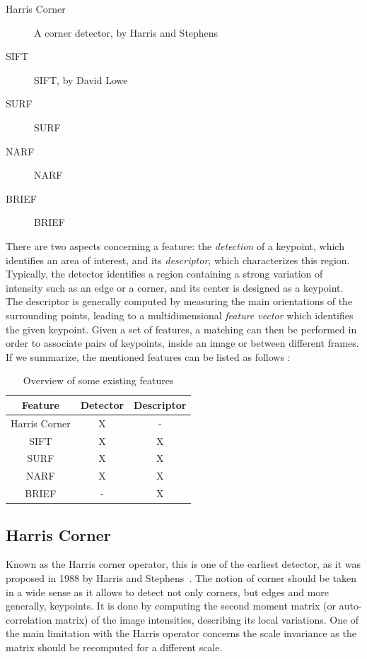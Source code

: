 \begin{description}
\item[Harris Corner] A corner detector, by Harris and Stephens~\cite{Harris88alvey}
\item[\acrshort{SIFT}]\acrlong{SIFT}, by David Lowe~\cite{lowe_2004_sift} 
\item[\acrshort{SURF}]\acrlong{SURF}~\cite{surf}
\item[\acrshort{NARF}]\acrlong{NARF}~\cite{steder10irosws}
\item[\acrshort{BRIEF}]\acrlong{BRIEF}~\cite{Calonder10-brief}
\end{description}

There are two aspects concerning a feature: the \emph{detection} of a keypoint, which identifies an area of interest, and its \emph{descriptor}, which characterizes this region. Typically, the detector identifies a region containing a strong variation of intensity such as an edge or a corner, and its center is designed as a keypoint. The descriptor is generally computed by measuring the main orientations of the surrounding points, leading to a multidimensional \emph{feature vector} which identifies the given keypoint. Given a set of features, a matching can then be performed in order to associate pairs of keypoints, inside an image or between different frames. If we summarize, the mentioned features can be listed as follows :

\begin {table}
 \begin{center}
  \begin{tabular}{c|cc}
  \hline
  Feature & Detector & Descriptor \\
  \hline
  Harris Corner & X & - \\
  SIFT & X & X \\
  SURF & X & X \\
  NARF & X & X \\
  BRIEF & - & X \\
  \hline
  \end{tabular}
 \end{center}
\caption {Overview of some existing features}
\end{table}

\subsection{Harris Corner}

Known as the Harris corner operator, this is one of the earliest detector, as it was proposed in 1988 by Harris and Stephens~\cite{Harris88alvey}. The  notion of corner should be taken in a wide sense as it allows to detect not only corners, but edges and more generally, keypoints. It is done by computing the second moment matrix (or auto-correlation matrix) of the image intensities, describing its local variations. One of the main limitation with the Harris operator concerns the scale invariance as the matrix should be recomputed for a different scale.

